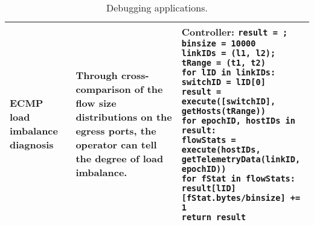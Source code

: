 \begin{table}[!h]
{\begin{tabular}{C{2cm} L{6cm} L{9cm}}
\midrule
ECMP load imbalance diagnosis~\cite{loadimb} &  Through cross-comparison of the flow size distributions on the egress ports,
					the operator can tell the degree of load imbalance.
				&  	\textbf{Controller:} \newline
					\texttt{result = {}; binsize = 10000 \newline
					linkIDs = (l1, l2); tRange = (t1, t2) \newline
					for lID in linkIDs: \newline
					\hspace{0.3cm} switchID = lID[0] \newline
					\hspace{0.3cm} result = execute([switchID], \newline
					\hspace{4cm} getHosts(tRange)) \newline
					for epochID, hostIDs in result: \newline
					\hspace{0.3cm} flowStats = execute(hostIDs, \newline
					\hspace{0.3cm} \hspace{0.6cm} getTelemetryData(linkID, epochID)) \newline
					\hspace{0.3cm} for fStat in flowStats: \newline
					\hspace{0.3cm} \hspace{0.2cm} result[lID][fStat.bytes/binsize] += 1 \newline
					return result }  \\

\bottomrule
\end{tabular}
}
\caption{Debugging applications.}
\label{tbl:apps}
\end{table}

